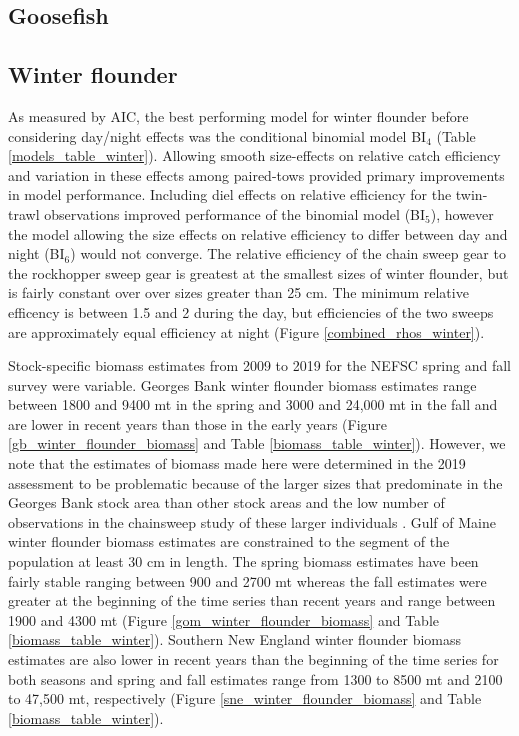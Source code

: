\documentclass[]{article}
\begin{document}
\hypertarget{goosefish}{%
\subsection{Goosefish}\label{goosefish}}

\hypertarget{winter-flounder}{%
\subsection{Winter flounder}\label{winter-flounder}}

As measured by AIC, the best performing model for winter flounder before
considering day/night effects was the conditional binomial model
BI\(_4\) (Table \ref{models_table_winter}). Allowing smooth size-effects
on relative catch efficiency and variation in these effects among
paired-tows provided primary improvements in model performance.
Including diel effects on relative efficiency for the twin-trawl
observations improved performance of the binomial model (BI\(_5\)),
however the model allowing the size effects on relative efficiency to
differ between day and night (BI\(_6\)) would not converge. The relative
efficiency of the chain sweep gear to the rockhopper sweep gear is
greatest at the smallest sizes of winter flounder, but is fairly
constant over over sizes greater than 25 cm. The minimum relative
efficency is between 1.5 and 2 during the day, but efficiencies of the
two sweeps are approximately equal efficiency at night (Figure
\ref{combined_rhos_winter}).

Stock-specific biomass estimates from 2009 to 2019 for the NEFSC spring
and fall survey were variable. Georges Bank winter flounder biomass
estimates range between 1800 and 9400 mt in the spring and 3000 and
24,000 mt in the fall and are lower in recent years than those in the
early years (Figure \ref{gb_winter_flounder_biomass} and Table
\ref{biomass_table_winter}). However, we note that the estimates of
biomass made here were determined in the 2019 assessment to be
problematic because of the larger sizes that predominate in the Georges
Bank stock area than other stock areas and the low number of
observations in the chainsweep study of these larger individuals
\citep{nefsc2020}. Gulf of Maine winter flounder biomass estimates are
constrained to the segment of the population at least 30 cm in length.
The spring biomass estimates have been fairly stable ranging between 900
and 2700 mt whereas the fall estimates were greater at the beginning of
the time series than recent years and range between 1900 and 4300 mt
(Figure \ref{gom_winter_flounder_biomass} and Table
\ref{biomass_table_winter}). Southern New England winter flounder
biomass estimates are also lower in recent years than the beginning of
the time series for both seasons and spring and fall estimates range
from 1300 to 8500 mt and 2100 to 47,500 mt, respectively (Figure
\ref{sne_winter_flounder_biomass} and Table \ref{biomass_table_winter}).
\end{document}

